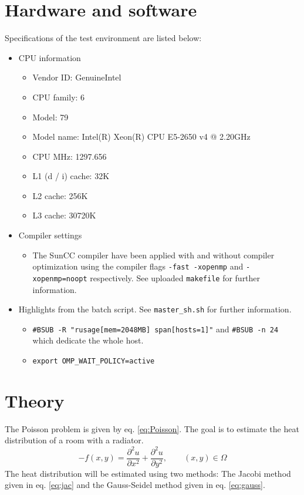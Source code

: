 \section{Hardware and software}
Specifications of the test environment are listed below:
\begin{itemize}
\item CPU information
\begin{itemize}
\item Vendor ID:             GenuineIntel
\item CPU family:            6
\item Model:                 79
\item Model name:            Intel(R) Xeon(R) CPU E5-2650 v4 @ 2.20GHz
\item CPU MHz:               1297.656
\item L1 (d / i) cache:             32K
\item L2 cache:              256K
\item L3 cache:              30720K
\end{itemize}
\item Compiler settings%
\begin{itemize}
\item The SunCC compiler have been applied with and without compiler optimization using the compiler flags \texttt{-fast -xopenmp} and \texttt{-xopenmp=noopt} respectively. See uploaded \texttt{makefile} for further information.
\end{itemize}
\item Highlights from the batch script. See \texttt{master\_sh.sh} for further information.
\begin{itemize}
\item \texttt{\#BSUB -R "rusage[mem=2048MB] span[hosts=1]"} and \texttt{\#BSUB -n 24} which dedicate the whole host.
\item \texttt{export OMP\_WAIT\_POLICY=active}
\end{itemize}
\end{itemize}


\section{Theory}
The Poisson problem is given by eq. \ref{eq:Poisson}. The goal is to estimate the heat distribution of a room with a radiator.
\begin{equation}
    -f(x,y)
   = \frac{\partial^2 u}{\partial x^2}
      + \frac{\partial^2 u}{\partial y^2}, \qquad (x,y) \in \Omega
\label{eq:Poisson}
\end{equation}
The heat distribution will be estimated using two methods: The Jacobi method given in eq. \ref{eq:jac} and the Gauss-Seidel method given in eq. \ref{eq:gauss}.

